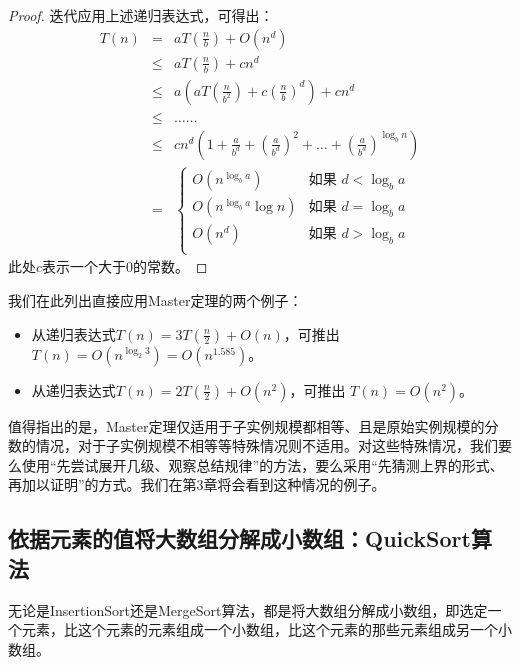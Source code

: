 	\begin{proof}
		迭代应用上述递归表达式，可得出：
		\begin{eqnarray}
		T(n) &=& a T(\tfrac{n}{b}) + O( n^{d} )\nonumber \\
		&\leq& a T(\tfrac{n}{b}) + c n^{d} \nonumber \\ 
		          &\leq& a ( a T(\tfrac{n}{b^{2}}) + c (\tfrac{n}{b})^{d} ) +   c n^{d} \nonumber\\ 
		          &\leq& \dots\dots  \nonumber\\ 
		          &\leq& c n^{d} ( 1 + \tfrac{a}{b^{d}} + (\tfrac{a}{b^{d}})^{2} + \hdots + (\tfrac{a}{b^{d}})^{\log_{b}{n}} ) \nonumber\\ 
		          &=&\begin{cases}
		          		O(n^{\log_b a }) & \text{如果 } d < \log_b a  \\ 
		          		O(n^{\log_b a } \log n ) & \text{如果 } d = \log_b a  \\ 
		          		O( n^d ) & \text{如果 } d > \log_b a  \\ 
		          \end{cases}\nonumber
   		\end{eqnarray}
	此处$c$表示一个大于0的常数。
	\end{proof}

我们在此列出直接应用Master定理的两个例子：

\begin{itemize}
 \item 从递归表达式$T(n) = 3 T(\frac{n}{2}) + O(n)$，可推出
$T(n) = O(n^{\log_2 3}) = O(n^{1.585})$。
 \item 从递归表达式$T(n) = 2 T(\frac{n}{2}) + O(n^2)$，可推出
$T(n)= O(n^2)$。
\end{itemize}

值得指出的是，Master定理仅适用于子实例规模都相等、且是原始实例规模的分数的情况，对于子实例规模不相等等特殊情况则不适用。对这些特殊情况，我们要么使用“先尝试展开几级、观察总结规律”的方法，要么采用“先猜测上界的形式、再加以证明”的方式。我们在第3章将会看到这种情况的例子。

\subsection{依据元素的值将大数组分解成小数组：{\sc QuickSort}算法}
无论是{\sc InsertionSort}还是{\sc MergeSort}算法，都是将大数组分解成小数组，即选定一个元素，比这个元素的元素组成一个小数组，比这个元素的那些元素组成另一个小数组。

